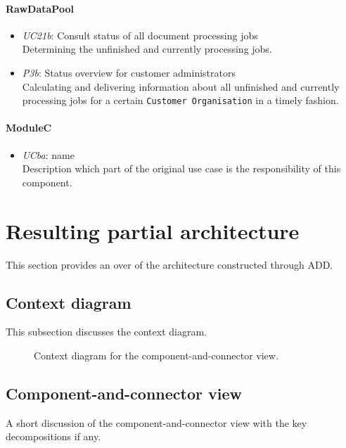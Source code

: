 \documentclass[a4paper,10pt]{article}
\begin{document}
\paragraph{RawDataPool}
\begin{itemize}
	\item \emph{UC21b}: Consult status of all document processing jobs\\
	Determining the unfinished and currently processing jobs.
	\item \emph{P3b}: Status overview for customer administrators\\
	Calculating and delivering information about all unfinished and currently processing jobs for a certain \texttt{Customer Organisation} in a timely fashion.
\end{itemize}

\paragraph{ModuleC}
\begin{itemize}
    \item \emph{UCba}: name\\Description which part of the original use case is
        the responsibility of this component.
\end{itemize}

\section{Resulting partial architecture}\label{sec:architecture}
This section provides an over of the architecture constructed through ADD\@.

\subsection{Context diagram}
This subsection discusses the context diagram.

\begin{figure}[!htp]
    \centering
    \caption{Context diagram for the component-and-connector view.
        }\label{fig:cc_context}
\end{figure}

\subsection{Component-and-connector view}
A short discussion of the component-and-connector view with the key
decompositions if any.
\end{document}
